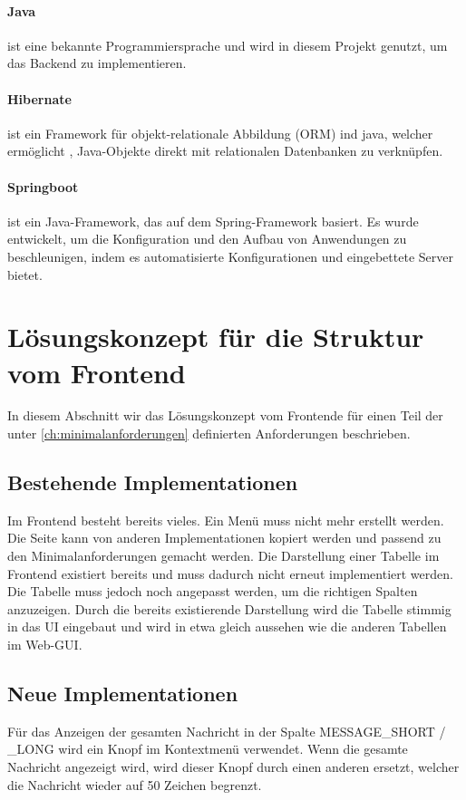 \paragraph{Java} ist eine bekannte Programmiersprache und wird in diesem Projekt genutzt, um das Backend zu implementieren.
\paragraph{Hibernate} ist ein Framework für objekt-relationale Abbildung (ORM) ind java, welcher ermöglicht , Java-Objekte direkt mit relationalen Datenbanken zu verknüpfen.
\paragraph{Springboot} ist ein Java-Framework, das auf dem Spring-Framework basiert. Es wurde entwickelt, um die Konfiguration und den Aufbau von Anwendungen zu beschleunigen, indem es automatisierte Konfigurationen und eingebettete Server bietet.

\section{Lösungskonzept für die Struktur vom Frontend}
In diesem Abschnitt wir das Lösungskonzept vom Frontende für einen Teil der unter \ref{ch:minimalanforderungen} definierten Anforderungen beschrieben.

\subsection{Bestehende Implementationen}
Im Frontend besteht bereits vieles. Ein Menü muss nicht mehr erstellt werden. Die Seite kann von anderen Implementationen kopiert werden und passend zu den Minimalanforderungen gemacht werden. Die Darstellung einer Tabelle im Frontend existiert bereits und muss dadurch nicht erneut implementiert werden. Die Tabelle muss jedoch noch angepasst werden, um die richtigen Spalten anzuzeigen. Durch die bereits existierende Darstellung wird die Tabelle stimmig in das UI eingebaut und wird in etwa gleich aussehen wie die anderen Tabellen im Web-GUI.

\subsection{Neue Implementationen}
Für das Anzeigen der gesamten Nachricht in der Spalte MESSAGE\_SHORT / \_LONG wird ein Knopf im Kontextmenü verwendet. Wenn die gesamte Nachricht angezeigt wird, wird dieser Knopf durch einen anderen ersetzt, welcher die Nachricht wieder auf 50 Zeichen begrenzt.

